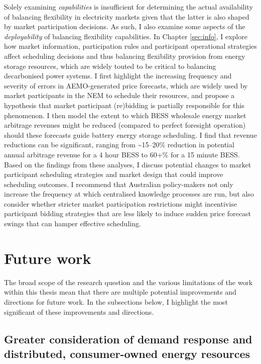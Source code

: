 \documentclass[12pt,a4paper,]{report}
\begin{document}
Solely examining \emph{capabilities} is insufficient for determining the
actual availability of balancing flexibility in electricity markets
given that the latter is also shaped by market participation decisions.
As such, I also examine some aspects of the \emph{deployability} of
balancing flexibility capabilities. In Chapter \ref{sec:info}, I explore
how market information, participation rules and participant operational
strategies affect scheduling decisions and thus balancing flexibility
provision from energy storage resources, which are widely touted to be
critical to balancing decarbonised power systems. I first highlight the
increasing frequency and severity of errors in AEMO-generated price
forecasts, which are widely used by market participants in the NEM to
schedule their resources, and propose a hypothesis that market
participant (re)bidding is partially responsible for this phenomenon. I
then model the extent to which BESS wholesale energy market arbitrage
revenues might be reduced (compared to perfect foresight operation)
should these forecasts guide battery energy storage scheduling. I find
that revenue reductions can be significant, ranging from
\textasciitilde15--20\% reduction in potential annual arbitrage revenue
for a 4 hour BESS to 60+\% for a 15 minute BESS. Based on the findings
from these analyses, I discuss potential changes to market participant
scheduling strategies and market design that could improve scheduling
outcomes. I recommend that Australian policy-makers not only increase
the frequency at which centralised knowledge processes are run, but also
consider whether stricter market participation restrictions might
incentivise participant bidding strategies that are less likely to
induce sudden price forecast swings that can hamper effective
scheduling.

\hypertarget{sec:conclusion-future_work}{%
\section{Future work}\label{sec:conclusion-future_work}}

The broad scope of the research question and the various limitations of
the work within this thesis mean that there are multiple potential
improvements and directions for future work. In the subsections below, I
highlight the most significant of these improvements and directions.

\hypertarget{greater-consideration-of-demand-response-and-distributed-consumer-owned-energy-resources}{%
\subsection{Greater consideration of demand response and distributed,
consumer-owned energy
resources}\label{greater-consideration-of-demand-response-and-distributed-consumer-owned-energy-resources}}
\end{document}
